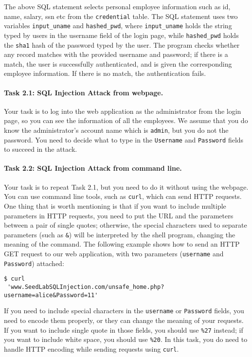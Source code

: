 The above SQL statement selects personal employee information such as id,
name, salary, ssn etc from the {\tt credential} table. The SQL statement
uses two variables \texttt{input\_uname} and \texttt{hashed\_pwd},
where \texttt{input\_uname} holds the string typed by 
users in the username field of the login page, while 
\texttt{hashed\_pwd} holds the \texttt{sha1} hash of the password typed by
the user. The program checks whether 
any record matches with the provided username and password; if there is a match,
the user is successfully authenticated, and is given the corresponding 
employee information. If there is no match, the authentication
fails. 



\paragraph{Task 2.1: SQL Injection Attack from webpage.}
Your task is to log into the web application as 
the administrator from the login page, so you can see the information of
all the employees. We assume that you do know the administrator's account name
which is {\tt admin}, but you do not the password. You need to decide
what to type in the \texttt{Username} and \texttt{Password} fields to
succeed in the attack.
	


\paragraph{Task 2.2: SQL Injection Attack from command line.}  
Your task is to repeat Task 2.1, but you need to do it without 
using the webpage. You can use command line tools, such as 
\texttt{curl}, which can send HTTP requests. 
One thing that is worth mentioning is that if you
want to include multiple parameters in HTTP requests, you need to put the
URL and the parameters between a pair of single quotes; otherwise, the 
special characters used to separate parameters (such as \texttt{\&}) will be
interpreted by the shell program, changing the meaning of the 
command. The following example shows how to send an HTTP GET request to our 
web application, with two parameters (\texttt{username} and 
\texttt{Password}) attached:

\begin{lstlisting}
$ curl 
 'www.SeedLabSQLInjection.com/unsafe_home.php?username=alice&Password=11'
\end{lstlisting}

If you need to include special characters in the 
\texttt{username} or \texttt{Password} fields, you need to 
encode them properly, or they can change the meaning of your 
requests. If you want to include single quote in those fields,
you should use \texttt{\%27} instead; if you want to include
white space, you should use \texttt{\%20}. In this
task, you do need to handle HTTP encoding while sending
requests using \texttt{curl}.



